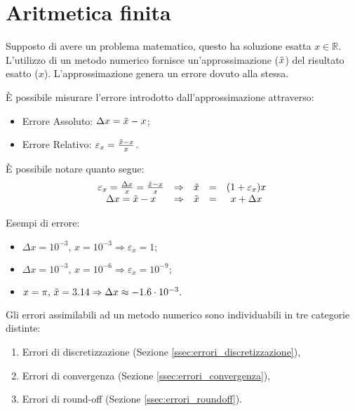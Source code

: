 \section{Aritmetica finita}\label{sec:aritmetica_finita}
Supposto di avere un problema matematico, questo ha soluzione esatta $x \in\mathbb R$. L'utilizzo di un metodo numerico fornisce un'approssimazione ($\Tilde{x}$) del risultato esatto ($x$). L'approssimazione genera un errore dovuto alla stessa.

È possibile misurare l'errore introdotto dall'approssimazione attraverso:
\begin{itemize}
	\item Errore Assoluto: $\Delta x = \Tilde{x}-x$;
	\item Errore Relativo: $\varepsilon_x=\frac{\Tilde{x}-x}{x}$. 
\end{itemize}

È possibile notare quanto segue:
\begin{equation*}
	\begin{matrix}
		\varepsilon_x=\frac{\Delta x}{x}=\frac{\Tilde{x}-x}{x} & \Rightarrow & \Tilde{x} &=& (1+\varepsilon_x)x\\
		\Delta  x = \Tilde{x}-x & \Rightarrow & \Tilde{x}&=& x+\Delta x
	\end{matrix}
\end{equation*}

\begin{example}
	Esempi di errore:
	\begin{itemize}
		\item $\Delta x = 10^{-3},\, x=10^{-3}\Rightarrow \varepsilon_x = 1;$
		\item  $\Delta x = 10^{-3},\, x=10^{-6}\Rightarrow\varepsilon_x = 10^{-9};$
		\item $x=\pi,\,\Tilde{x}=3.14 \Rightarrow\Delta x \approx -1.6\cdot 10^{-3}.$
	\end{itemize}
\end{example}

Gli errori assimilabili ad un metodo numerico sono individuabili in tre categorie distinte:
\begin{enumerate}
	\item Errori di discretizzazione (Sezione \ref{ssec:errori_discretizzazione}),
	\item Errori di convergenza (Sezione \ref{ssec:errori_convergenza}),
	\item Errori di round-off (Sezione \ref{ssec:errori_roundoff}).
\end{enumerate}


